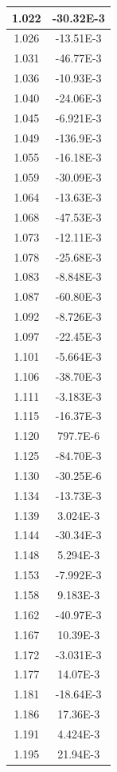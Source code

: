 \documentclass[english, 12pt, a4paper]{ifimaster}
\begin{document}
\begin{appendices}
\begin{center}
\begin{longtable}[htbp]{|c|c|}
\hline
  1.022 & -30.32E-3 \\
\hline
  1.026 & -13.51E-3 \\
\hline
  1.031 & -46.77E-3 \\
\hline
  1.036 & -10.93E-3 \\
\hline
  1.040 & -24.06E-3 \\
\hline
  1.045 & -6.921E-3 \\
\hline
  1.049 & -136.9E-3 \\
\hline
  1.055 & -16.18E-3 \\
\hline
  1.059 & -30.09E-3 \\
\hline
  1.064 & -13.63E-3 \\
\hline
  1.068 & -47.53E-3 \\
\hline
  1.073 & -12.11E-3 \\
\hline
  1.078 & -25.68E-3 \\
\hline
  1.083 & -8.848E-3 \\
\hline
  1.087 & -60.80E-3 \\
\hline
  1.092 & -8.726E-3 \\
\hline
  1.097 & -22.45E-3 \\
\hline
  1.101 & -5.664E-3 \\
\hline
  1.106 & -38.70E-3 \\
\hline
  1.111 & -3.183E-3 \\
\hline
  1.115 & -16.37E-3 \\
\hline
  1.120 & 797.7E-6 \\
\hline
  1.125 & -84.70E-3 \\
\hline
  1.130 & -30.25E-6 \\
\hline
  1.134 & -13.73E-3 \\
\hline
  1.139 & 3.024E-3 \\
\hline
  1.144 & -30.34E-3 \\
\hline
  1.148 & 5.294E-3 \\
\hline
  1.153 & -7.992E-3 \\
\hline
  1.158 & 9.183E-3 \\
\hline
  1.162 & -40.97E-3 \\
\hline
  1.167 & 10.39E-3 \\
\hline
  1.172 & -3.031E-3 \\
\hline
  1.177 & 14.07E-3 \\
\hline
  1.181 & -18.64E-3 \\
\hline
  1.186 & 17.36E-3 \\
\hline
  1.191 & 4.424E-3 \\
\hline
  1.195 & 21.94E-3 \\
\hline
\end{longtable}
\end{center}



\end{appendices}
\end{document}
